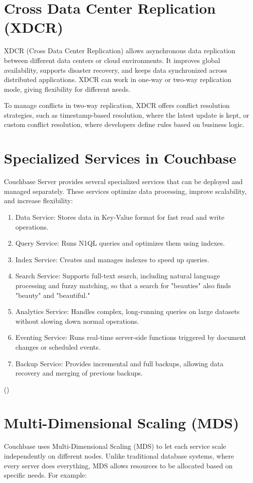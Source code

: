 \section{Cross Data Center Replication (XDCR)}
XDCR (Cross Data Center Replication) allows asynchronous data replication between different data centers or cloud environments. It improves global availability, supports disaster recovery, and keeps data synchronized across distributed applications. XDCR can work in one-way or two-way replication mode, giving flexibility for different needs.

To manage conflicts in two-way replication, XDCR offers conflict resolution strategies, such as timestamp-based resolution, where the latest update is kept, or custom conflict resolution, where developers define rules based on business logic.

\section{Specialized Services in Couchbase}
Couchbase Server provides several specialized services that can be deployed and managed separately. These services optimize data processing, improve scalability, and increase flexibility:

\begin{enumerate}
    \item Data Service: Stores data in Key-Value format for fast read and write operations.
    \item Query Service: Runs N1QL queries and optimizes them using indexes.
    \item Index Service: Creates and manages indexes to speed up queries.
    \item Search Service: Supports full-text search, including natural language processing and fuzzy matching, so that a search for "beauties" also finds "beauty" and "beautiful."
    \item Analytics Service: Handles complex, long-running queries on large datasets without slowing down normal operations.
    \item Eventing Service: Runs real-time server-side functions triggered by document changes or scheduled events.
    \item Backup Service: Provides incremental and full backups, allowing data recovery and merging of previous backups.
  \end{enumerate}
(\cite{CouchbaseServices})


\section{Multi-Dimensional Scaling (MDS)}
Couchbase uses Multi-Dimensional Scaling (MDS) to let each service scale independently on different nodes. Unlike traditional database systems, where every server does everything, MDS allows resources to be allocated based on specific needs.
For example:

